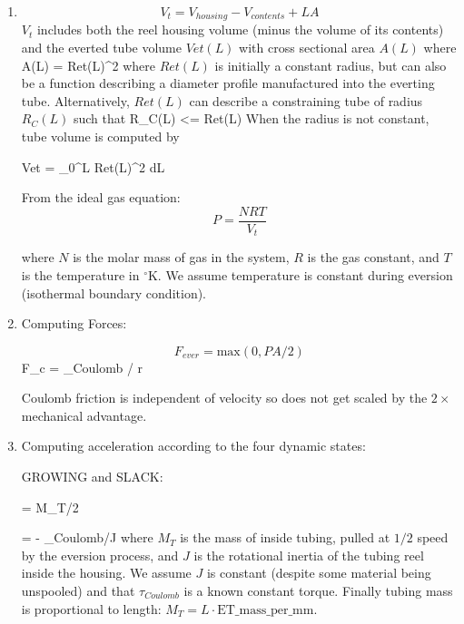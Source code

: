 \documentclass[letterpaper]{article}
\begin{document}
\begin{enumerate}
\item
\begin{equation}\label{eqOneCompartmentVol}
V_t = V_{housing} - V_{contents} + L  A
\end{equation}
$V_t$ includes both the reel housing volume (minus the volume of its contents)
and the everted tube volume $Vet(L)$ with cross sectional area $A(L)$
where
\beq
A(L) = \pi Ret(L)^2
\eeq
where $Ret(L)$ is initially a constant radius, but can also
be a function describing a diameter profile manufactured into the
everting tube. Alternatively, $Ret(L)$ can describe a constraining
tube of radius $R_C(L)$ such that
\beq
R_C(L) <= Ret(L)
\eeq
When the radius is not constant, tube volume is computed by

\beq
Vet = \pi \int_0^L Ret(L)^2 dL
\eeq

From the ideal gas equation:
\begin{equation}\label{eqOneCompartmentPress}
P = \frac{N  RT}{ V_t}
\end{equation}

where $N$ is the molar mass of gas in the system, $R$ is the gas constant, and $T$ is the temperature
in $^\circ$K.  We assume temperature is constant during eversion (isothermal boundary condition).
%


\item

Computing Forces:


\begin{equation}
  F_{ever} = \mathrm{max}(0, PA/2)
\end{equation}
\beq
  F_{c} = \tau_{Coulomb} / r
\eeq

Coulomb friction is independent of velocity so does not get scaled by the
$2\times$ mechanical advantage.

\item Computing acceleration according to the four dynamic states:

GROWING and SLACK:

\beq
{} =   {M_T/2}
\eeq

\beq
\ddot{\theta} = - \tau_{Coulomb}/J
\eeq
where $M_T$ is the mass of inside tubing, pulled at $1/2$ speed
by the eversion process, and $J$ is the rotational inertia of
the tubing reel inside the housing. We assume $J$ is constant
(despite some material being unspooled) and that
$\tau_{Coulomb}$ is a known constant torque. Finally tubing mass is proportional to length:
$M_T = L \cdot \mathrm{ET\_mass\_per\_mm} $.


\end{enumerate}
\end{document}
